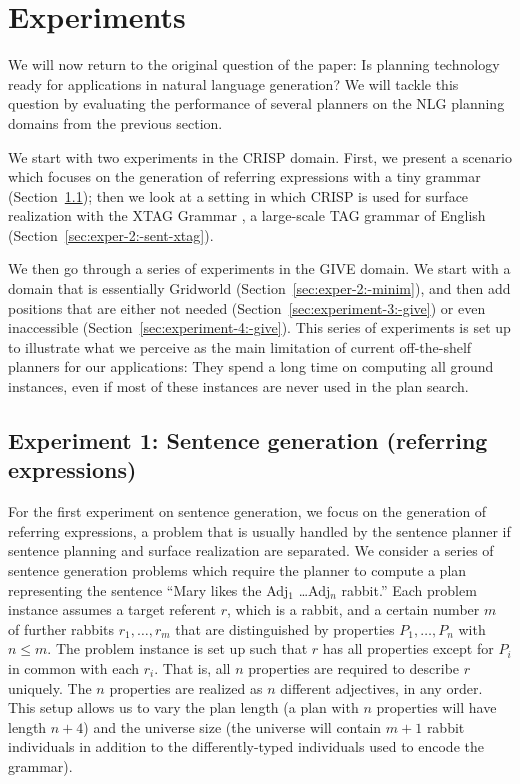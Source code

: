 \section{Experiments}
\label{sec:experiments}

We will now return to the original question of the paper: Is planning
technology ready for applications in natural language generation? We
will tackle this question by evaluating the performance of several
planners on the NLG planning domains from the previous section.

We start with two experiments in the CRISP domain. First, we present a
scenario which focuses on the generation of referring expressions with
a tiny grammar (Section~\ref{sec:exper-1:-sent}); then we look at a
setting in which CRISP is used for surface realization with the XTAG
Grammar \citep{xtag01:_tr}, a large-scale TAG grammar of English
(Section~\ref{sec:exper-2:-sent-xtag}).

We then go through a series of experiments in the GIVE domain. We
start with a domain that is essentially Gridworld
(Section~\ref{sec:exper-2:-minim}), and then add positions that are
either not needed (Section~\ref{sec:experiment-3:-give}) or even
inaccessible (Section~\ref{sec:experiment-4:-give}). This series of
experiments is set up to illustrate what we perceive as the main
limitation of current off-the-shelf planners for our applications:
They spend a long time on computing all ground instances, even if most
of these instances are never used in the plan search.



\subsection{Experiment 1: Sentence generation (referring expressions)}
\label{sec:exper-1:-sent}

For the first experiment on sentence generation, we focus on the
generation of referring expressions, a problem that is usually handled
by the sentence planner if sentence planning and surface realization
are separated. We consider a series of sentence generation problems
which require the planner to compute a plan representing the sentence
``Mary likes the Adj$_1$ \ldots Adj$_n$ rabbit.''  Each problem
instance assumes a target referent $r$, which is a rabbit, and a
certain number $m$ of further rabbits $r_1,\ldots,r_m$ that are
distinguished by properties $P_1,\ldots,P_n$ with $n \leq m$. The
problem instance is set up such that $r$ has all properties except for
$P_i$ in common with each $r_i$. That is, all $n$ properties are
required to describe $r$ uniquely. The $n$ properties are realized as
$n$ different adjectives, in any order.  This setup allows us to vary
the plan length (a plan with $n$ properties will have length $n+4$)
and the universe size (the universe will contain $m+1$ rabbit
individuals in addition to the differently-typed individuals used to
encode the grammar).


